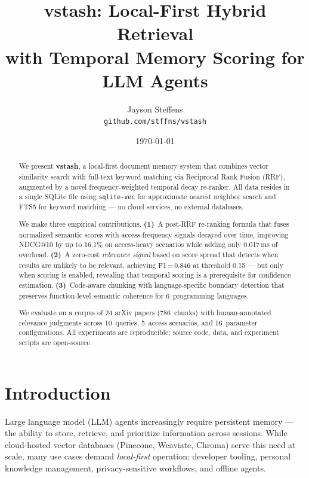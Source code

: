 \documentclass[11pt,a4paper]{article}
\title{%
  \textbf{vstash: Local-First Hybrid Retrieval\\
  with Temporal Memory Scoring for LLM Agents}
}
\author{
  Jayson Steffens \\
  \texttt{github.com/stffns/vstash}
}
\date{\today}
\begin{document}
\maketitle

\begin{abstract}
We present \textbf{vstash}, a local-first document memory system that
combines vector similarity search with full-text keyword matching via
Reciprocal Rank Fusion (RRF), augmented by a novel frequency-weighted
temporal decay re-ranker.  All data resides in a single SQLite file
using \texttt{sqlite-vec} for approximate nearest neighbor search and
FTS5 for keyword matching --- no cloud services, no external databases.

We make three empirical contributions.
\textbf{(1)}~A post-RRF re-ranking formula that fuses normalized
semantic scores with access-frequency signals decayed over time,
improving NDCG@10 by up to 16.1\% on access-heavy scenarios while
adding only 0.017\,ms of overhead.
\textbf{(2)}~A zero-cost \emph{relevance signal} based on score spread
that detects when results are unlikely to be relevant, achieving
F1\,=\,0.846 at threshold 0.15 --- but only when scoring is enabled,
revealing that temporal scoring is a prerequisite for confidence
estimation.
\textbf{(3)}~Code-aware chunking with language-specific boundary
detection that preserves function-level semantic coherence for
6~programming languages.

We evaluate on a corpus of 24 arXiv papers (786~chunks) with
human-annotated relevance judgments across 10~queries, 5~access
scenarios, and 16~parameter configurations. All experiments are
reproducible; source code, data, and experiment scripts are
open-source.
\end{abstract}

\section{Introduction}
\label{sec:intro}

Large language model (LLM) agents increasingly require persistent memory
--- the ability to store, retrieve, and prioritize information across
sessions.  While cloud-hosted vector databases (Pinecone, Weaviate,
Chroma) serve this need at scale, many use cases demand
\emph{local-first} operation: developer tooling, personal knowledge
management, privacy-sensitive workflows, and offline agents.
\end{document}
